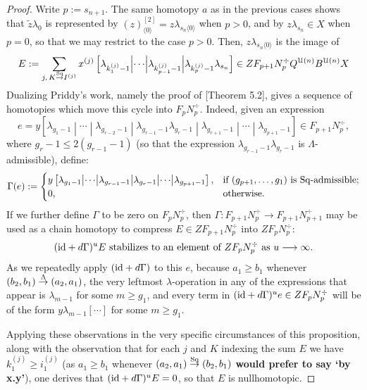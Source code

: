 \documentclass[11pt]{amsart}
\theoremstyle{plain}
\theoremstyle{definition}
\renewcommand{\to}{\longrightarrow}
\newcommand{\calU}{\mathcal{U}}
\theoremstyle{plain}
\newcommand{\restnwithsubscript}[2]{#1^{[2]}_{#2}}
\newcommand{\produces}[3]{#3:#1\sim #2}
\renewcommand{\produces}[3]{#1\rightarrow_{#3} #2}%
\renewcommand{\produces}[3]{#1\overset{\smash{#3}}{\rightarrow} #2}%
\newcommand{\Sq}{\mathrm{Sq}}
\newcommand{\Id}{\textup{id}}
\begin{document}
\begin{Koszul complexes}
\begin{proof}
Write $p:=s_{n+1}$. The same homotopy $a$ as in the previous cases shows that $\widetilde{z}\lambda_0$ is represented by $\restnwithsubscript{(z)}{\langle 0\rangle}=z\lambda_{s_n\langle 0\rangle}$ when $p>0$, and by $z\lambda_{s_n}\in X$ when $p=0$, so that we may restrict to the case $p>0$. Then, $z\lambda_{s_n\langle 0\rangle}$ is the image of
\[E:=\sum_{j,\,\produces{K}{I^{(j)}}{\Sq}}x^{(j)}\left[\lambda_{k_1^{(j)}-1} \middle|\cdots\middle| \lambda_{k_{p-1}^{(j)}-1} \middle|\lambda_{k_{p}^{(j)}-1}\lambda_{s_n} \right]\in ZF_{p+1}N^\div_{p}Q^{\calU(n)}B^{\calU(n)}X\]
Dualizing Priddy's work, namely the proof of [Theorem 5.2], gives a sequence of homotopies which move this cycle into $F_pN_p^\div$. Indeed, given an expression
\[e=y\left[\lambda_{g_1-1} \middle|\cdots \middle|\lambda_{g_{r-2}-1}\middle|
\lambda_{g_{r-1}-1}\lambda_{g_r-1}\middle|\lambda_{g_{r+1}-1}\middle|\cdots\middle|\lambda_{g_{p+1}-1}\right]\in F_{p+1}N_p^\div,\]
where $g_{r}-1\leq 2(g_{r-1}-1)$ (so that the expression $\lambda_{g_{r-1}-1}\lambda_{g_r-1}$ is $\Lambda$-admissible), define:
\[\Gamma(e):=\begin{cases}
y\left[\lambda_{g_1-1} \middle|\cdots \middle|
\lambda_{g_{r-1}-1}\middle|\lambda_{g_r-1}\middle|\cdots\middle|\lambda_{g_{p+1}-1}\right],&\textup{if }(g_{p+1},\ldots,g_{1})\textup{ is $\Sq$-admissible};\\
0,&\textup{otherwise}.
\end{cases}\]
If we further define $\Gamma$ to be zero on $F_pN_p^\div$, then $\Gamma:F_{p+1}N^\div_p\to F_{p+1}N^\div_{p+1}$ may be used as a chain homotopy to compress $E\in ZF_{p+1}N^\div_p$ into $ZF_pN^\div_p$:
\[(\Id+d\Gamma)^uE\textup{ stabilizes to an element of } ZF_pN_p^\div\textup{ as $u\to\infty$.}\]
As we repeatedly  apply $(\Id+d\Gamma)$ to this $e$, because $a_1\geq b_1$ whenever $\produces{(b_2,b_1)}{(a_2,a_1)}{\Lambda}$, the very leftmost $\lambda$-operation in any of the expressions that appear is $\lambda_{m-1}$ for some $m\geq g_1$, and every term in $(\Id+d\Gamma)^ue\in ZF_pN_p^\div$ will be of the form $y\lambda_{m-1}[{}\cdots{}]$ for some $m\geq g_1$.

Applying these observations in the very specific circumstances of this proposition, along with the observation that for each $j$ and $K$ indexing the sum $E$ we have $k_1^{(j)}\geq i_1^{(j)}$ (as $a_1\geq b_1$ whenever $\produces{(a_2,a_1)}{(b_2,b_1)}{\Sq}$ \textbf{would prefer to say `by x.y'}), one derives that $(\Id+d\Gamma)^uE=0$, so that $E$ is nullhomotopic. 
%
%
\end{proof}
\end{Koszul complexes}
\end{document}

